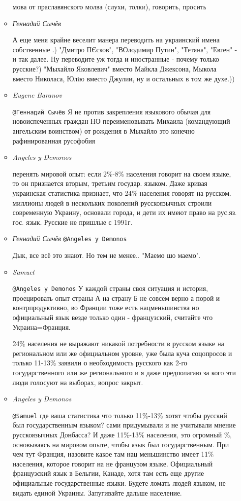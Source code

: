 \begin{itemize}
\begin{itemize}
мова от праславянского молва (слухи, толки), говорить, просить

\item \emph{Геннадий Сычёв}

А еще меня крайне веселит манера переводить на украинский имена собственные .)
"Дмитро ПЄсков", "ВОлодимир Путин", "Тетяна", "Евген" - и так далее. Ну
переводите уж тогда и иностранные - почему только русские?) "Мыхайло Яковлевич"
вместо Майкла Джексона, Мыкола вместо Николаса, Юлiю вместо Джулии, ну и
остальных в том же духе.))

\item \emph{Eugene Baranov}

\verb|@Геннадий Сычёв|  Я не против закрепления языкового обычая для новоиспеченных
граждан НО переименовывать Михаила (командующий ангельским воинством) от
рождения в Мыхайло это конечно рафинированная русофобия

\item \emph{Angeles y Demonos}

перенять мировой опыт: если 2\%-8\% населения говорит на своем языке, то он
признается вторым, третьим государ. языком. Даже кривая украинская статистика
признает, что 24\% населения говорят на русском. миллионы людей в нескольких
поколений русскоязычных строили современную Украину, основали города, и дети их
имеют право на рус.яз. гос. язык. Русские не пришлые с 1991г.

\item \emph{Геннадий Сычёв}
\verb|@Angeles y Demonos|  

Дык, все всё это знают.
Но тем не менее..
"Маемо шо маемо".

\item \emph{Samuel}

\verb|@Angeles y Demonos|  У каждой страны своя ситуация и история,
проецировать опыт страны А на страну Б не совсем верно а порой и
контрпродуктивно, во Франции тоже есть нацменьшинства но официальный язык
везде только один - французский, считайте что Украина=Франция.

24\% населения не выражают никакой потребности в русском языке на региональном
или же официальном уровне, уже была куча соцопросов и только 11-13\% заявили о
необходимость русского как 2-го государственного или же регионального и я даже
предполагаю за кого эти люди голосуют на выборах, вопрос закрыт.

\item \emph{Angeles y Demonos}

\verb|@Samuel|  где ваша статистика что только 11\%-13\% хотят чтобы русский был
государственным языком? сами придумывали и не учитывали мнение русскоязычных
Донбасса?  И даже 11\%-13\% населения, это огромный \%, основываясь на мировом
опыте, чтобы язык был государственным. При чем тут Франция, назовите какое там
нац меньшинство имеет 11\% населения, которое  говорит на не французом языке.
Официальный французский язык в Бельгии, Канаде, хотя там есть еще другие
официальные государственные языки. Будете ломать людей языком, не видать
единой Украины. Запугивайте дальше население.


\end{itemize}
\end{itemize}
